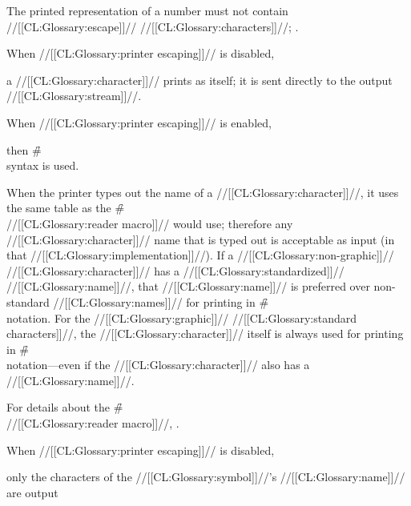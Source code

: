 \endsubsubsubsection%

The printed representation of a number must not contain //[[CL:Glossary:escape]]// //[[CL:Glossary:characters]]//; \seesection\EscCharsAndPotentialNums.

\endsubsubsubsection%


When //[[CL:Glossary:printer escaping]]// is disabled,

a //[[CL:Glossary:character]]// prints as itself; it is sent directly to the output //[[CL:Glossary:stream]]//. 

When //[[CL:Glossary:printer escaping]]// is enabled,

then \f{\#\\} syntax is used.

When the printer types out the name of a //[[CL:Glossary:character]]//, it uses the same table as the \f{\#\\} //[[CL:Glossary:reader macro]]// would use; therefore any //[[CL:Glossary:character]]// name that is typed out is acceptable as input (in that //[[CL:Glossary:implementation]]//). If a //[[CL:Glossary:non-graphic]]// //[[CL:Glossary:character]]// has a //[[CL:Glossary:standardized]]// //[[CL:Glossary:name]]//, that //[[CL:Glossary:name]]// is preferred over non-standard //[[CL:Glossary:names]]// for printing in \f{\#\\} notation. For the //[[CL:Glossary:graphic]]// //[[CL:Glossary:standard characters]]//, the //[[CL:Glossary:character]]// itself is always used for printing in \f{\#\\} notation---even if  the //[[CL:Glossary:character]]// also has a //[[CL:Glossary:name]]//.

For details about the \f{\#\\} //[[CL:Glossary:reader macro]]//, \seesection\SharpsignBackslash.

\endsubsubsection%


When //[[CL:Glossary:printer escaping]]// is disabled,

only the characters of the //[[CL:Glossary:symbol]]//'s //[[CL:Glossary:name]]// are output 

